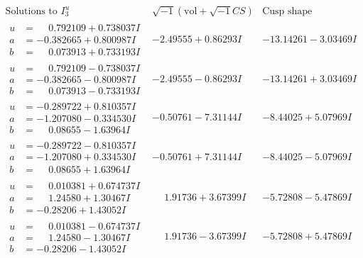 \documentclass[1p]{elsarticle_modified}
\theoremstyle{definition}
\newcommand{\I}{\sqrt{-1}}
\begin{document}
$$\begin{array}{c|c|c}  
\text{Solutions to }I^u_{3}& \I (\text{vol} + \sqrt{-1}CS) & \text{Cusp shape}\\
 \hline 
\begin{aligned}
u &= \phantom{-}0.792109 + 0.738037 I \\
a &= -0.382665 + 0.800987 I \\
b &= \phantom{-}0.073913 + 0.733193 I\end{aligned}
 & -2.49555 + 0.86293 I & -13.14261 - 3.03469 I \\ \hline\begin{aligned}
u &= \phantom{-}0.792109 - 0.738037 I \\
a &= -0.382665 - 0.800987 I \\
b &= \phantom{-}0.073913 - 0.733193 I\end{aligned}
 & -2.49555 - 0.86293 I & -13.14261 + 3.03469 I \\ \hline\begin{aligned}
u &= -0.289722 + 0.810357 I \\
a &= -1.207080 - 0.334530 I \\
b &= \phantom{-}0.08655 - 1.63964 I\end{aligned}
 & -0.50761 - 7.31144 I & -8.44025 + 5.07969 I \\ \hline\begin{aligned}
u &= -0.289722 - 0.810357 I \\
a &= -1.207080 + 0.334530 I \\
b &= \phantom{-}0.08655 + 1.63964 I\end{aligned}
 & -0.50761 + 7.31144 I & -8.44025 - 5.07969 I \\ \hline\begin{aligned}
u &= \phantom{-}0.010381 + 0.674737 I \\
a &= \phantom{-}1.24580 + 1.30467 I \\
b &= -0.28206 + 1.43052 I\end{aligned}
 & \phantom{-}1.91736 + 3.67399 I & -5.72808 - 5.47869 I \\ \hline\begin{aligned}
u &= \phantom{-}0.010381 - 0.674737 I \\
a &= \phantom{-}1.24580 - 1.30467 I \\
b &= -0.28206 - 1.43052 I\end{aligned}
 & \phantom{-}1.91736 - 3.67399 I & -5.72808 + 5.47869 I \\ \hline\begin{aligned}

\end{aligned}
\end{array}$$
\end{document}
